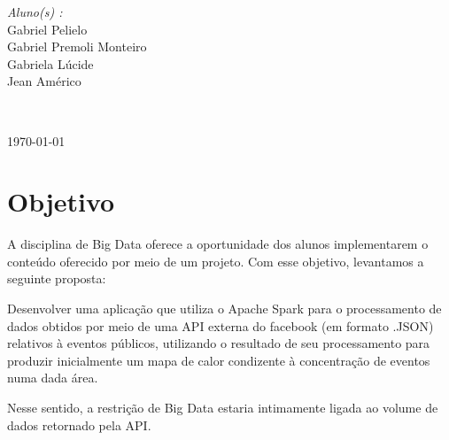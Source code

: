 \documentclass[numbers,a4paper,12pt]{article}
\begin{document}
\begin{titlepage}
\begin{minipage}{0.4\textwidth}
			\begin{flushright} \large
			\emph{Aluno(s) :} \\
			Gabriel Pelielo\\
            Gabriel Premoli Monteiro\\
            Gabriela Lúcide\\
            Jean Américo\\
		\end{flushright}
       	

   
	\end{minipage}\\[2 cm]
	
\begin{center}
	\small \today
\end{center}
    
    
    
    
	
\end{titlepage}


\tableofcontents
\pagebreak


\section{Objetivo}


A disciplina de Big Data oferece a oportunidade dos alunos implementarem o conteúdo oferecido por meio de um projeto. Com esse objetivo, levantamos a seguinte proposta: 

Desenvolver uma aplicação que utiliza o Apache Spark para o processamento de dados obtidos por meio de uma API externa do facebook (em formato .JSON) relativos à eventos públicos, utilizando o resultado de seu processamento para produzir inicialmente um mapa de calor condizente à concentração de eventos numa dada área.

Nesse sentido, a restrição de Big Data estaria intimamente ligada ao volume de dados retornado pela API.
\end{document}
